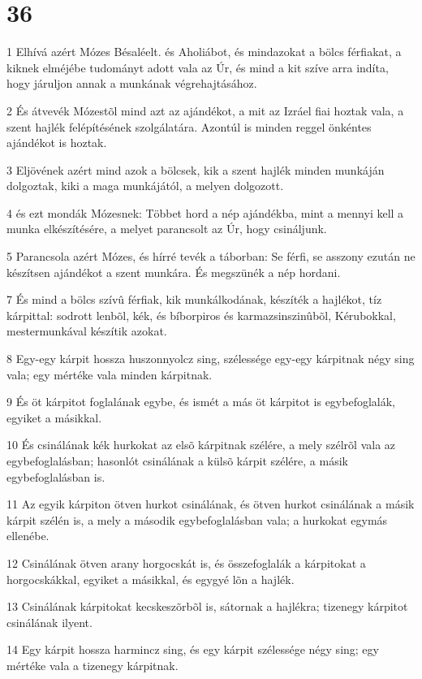 \chapter{36}

\par 1 Elhívá azért Mózes Bésaléelt. és Aholiábot, és mindazokat a bölcs férfiakat, a kiknek elméjébe tudományt adott vala az Úr, és mind a kit szíve arra indíta, hogy járuljon annak a munkának végrehajtásához.
\par 2 És átvevék Mózestõl mind azt az ajándékot, a mit az Izráel fiai hoztak vala, a szent hajlék felépítésének szolgálatára. Azontúl is minden reggel önkéntes ajándékot is hoztak.
\par 3 Eljövének azért mind azok a bölcsek, kik a szent hajlék minden munkáján dolgoztak, kiki a maga munkájától, a melyen dolgozott.
\par 4 és ezt mondák Mózesnek: Többet hord a nép ajándékba, mint a mennyi kell a munka elkészítésére, a melyet parancsolt az Úr, hogy csináljunk.
\par 5 Parancsola azért Mózes, és hírré tevék a táborban: Se férfi, se asszony ezután ne készítsen ajándékot a szent munkára. És megszünék a nép hordani.
\par 7 És mind a bölcs szívû férfiak, kik munkálkodának, készíték a hajlékot, tíz kárpittal: sodrott lenbõl, kék, és bíborpiros és karmazsinszinûbõl, Kérubokkal, mestermunkával készítik azokat.
\par 8 Egy-egy kárpit hossza huszonnyolcz sing, szélessége egy-egy kárpitnak négy sing vala; egy mértéke vala minden kárpitnak.
\par 9 És öt kárpitot foglalának egybe, és ismét a más öt kárpitot is egybefoglalák, egyiket a másikkal.
\par 10 És csinálának kék hurkokat az elsõ kárpitnak szélére, a mely szélrõl vala az egybefoglalásban; hasonlót csinálának a külsõ kárpit szélére, a másik egybefoglalásban is.
\par 11 Az egyik kárpiton ötven hurkot csinálának, és ötven hurkot csinálának a másik kárpit szélén is, a mely a második egybefoglalásban vala; a hurkokat egymás ellenébe.
\par 12 Csinálának ötven arany horgocskát is, és összefoglalák a kárpitokat a horgocskákkal, egyiket a másikkal, és egygyé lõn a hajlék.
\par 13 Csinálának kárpitokat kecskeszõrbõl is, sátornak a hajlékra; tizenegy kárpitot csinálának ilyent.
\par 14 Egy kárpit hossza harmincz sing, és egy kárpit szélessége négy sing; egy mértéke vala a tizenegy kárpitnak.
